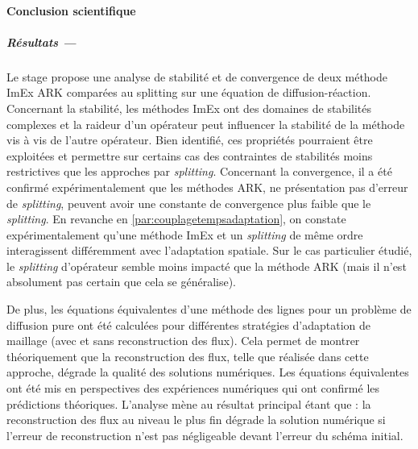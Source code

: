 \label{par:cc}
\paragraph*{Conclusion scientifique}\label{par:cc1}
\subparagraph*{Résultats —}  
Le stage propose une analyse de stabilité et de convergence de deux méthode ImEx ARK comparées au splitting sur une équation de diffusion-réaction. 
Concernant la stabilité, les méthodes ImEx ont des domaines de stabilités complexes et la raideur d'un opérateur peut influencer la stabilité de la méthode vis à vis de l'autre opérateur. 
Bien identifié, ces propriétés pourraient être exploitées et permettre sur certains cas des contraintes de stabilités moins restrictives que les approches par \textit{splitting}. Concernant la
convergence, il a été confirmé expérimentalement que les méthodes ARK, ne présentation pas d'erreur de \emph{splitting}, peuvent avoir une constante de convergence plus faible 
que le \emph{splitting}. En revanche en \ref{par:couplagetempsadaptation}, on constate expérimentalement qu'une méthode ImEx et un \emph{splitting} de même ordre interagissent différemment avec l'adaptation spatiale.
Sur le cas particulier étudié, le \textit{splitting} d'opérateur semble moins impacté que la méthode ARK (mais il n'est absolument pas certain que cela se généralise).\par

De plus, les équations équivalentes d'une méthode des lignes pour un problème de diffusion pure ont été calculées 
pour différentes stratégies d'adaptation de maillage (avec et sans reconstruction des flux). 
Cela permet de montrer théoriquement que la reconstruction des flux, telle que réalisée dans cette approche, dégrade la qualité des solutions numériques.
Les équations équivalentes ont été mis en perspectives des expériences numériques qui ont confirmé les prédictions théoriques.
L'analyse mène au résultat principal étant que : la reconstruction des flux au niveau le plus fin dégrade la solution numérique si l'erreur de reconstruction n'est pas négligeable devant l'erreur du schéma initial.

